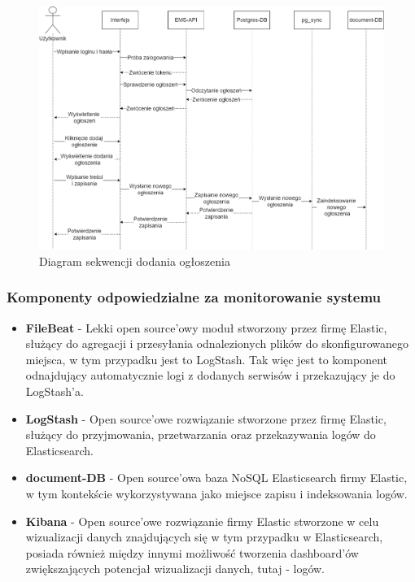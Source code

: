 \begin{figure}[H]
    \centering
    \includegraphics[width=1\linewidth]{img/sequence_diag_add_post.png}
    \caption{Diagram sekwencji dodania ogłoszenia}
    \label{fig:add_post_seq}
\end{figure}
\subsubsection{Komponenty odpowiedzialne za monitorowanie systemu}
\begin{itemize}
    \item \textbf{FileBeat} - Lekki open source'owy moduł stworzony przez firmę Elastic, służący do agregacji i przesyłania odnalezionych plików do skonfigurowanego miejsca, w tym przypadku jest to LogStash. Tak więc jest to komponent odnajdujący automatycznie logi z dodanych serwisów i przekazujący je do LogStash'a.
    \item \textbf{LogStash} - Open source'owe rozwiązanie stworzone przez firmę Elastic, służący do przyjmowania, przetwarzania oraz przekazywania logów do Elasticsearch.
    \item \textbf{document-DB} - Open source'owa baza NoSQL Elasticsearch firmy Elastic, w tym kontekście wykorzystywana jako miejsce zapisu i indeksowania logów.
    \item \textbf{Kibana} - Open source'owe rozwiązanie firmy Elastic stworzone w celu wizualizacji danych znajdujących się w tym przypadku w Elasticsearch, posiada również między innymi możliwość tworzenia dashboard'ów zwiększających potencjał wizualizacji danych, tutaj - logów.
\end{itemize}


